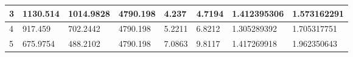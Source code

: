 \begin{table}[]
{\begin{tabular}{|l|l|l|l|l|l|l|l|}
3                                                                                     & 1130.514                                                                                                           & 1014.9828                                                                                                              & 4790.198                                                                                                                           & 4.237                                                                                                & 4.7194                                                                                                 & 1.412395306                                                                                          & 1.573162291                                                                                            \\ \hline
4                                                                                     & 917.459                                                                                                            & 702.2442                                                                                                               & 4790.198                                                                                                                           & 5.2211                                                                                               & 6.8212                                                                                                 & 1.305289392                                                                                          & 1.705317751                                                                                            \\ \hline
5                                                                                     & 675.9754                                                                                                           & 488.2102                                                                                                               & 4790.198                                                                                                                           & 7.0863                                                                                               & 9.8117                                                                                                 & 1.417269918                                                                                          & 1.962350643                                                                                            \\ \hline

\end{tabular}}
\end{table}
